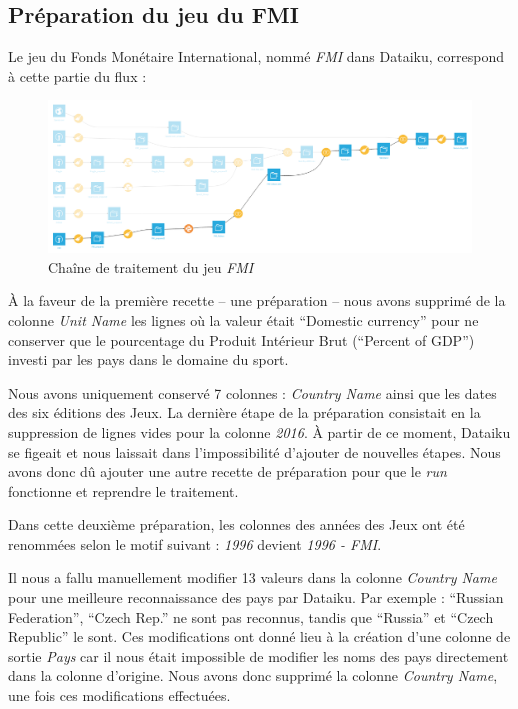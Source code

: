 \documentclass[hidelinks, 12pt]{report}
\begin{document}
\subsection{Préparation du jeu du FMI}

Le jeu du Fonds Monétaire International, nommé \textit{FMI} dans Dataiku, correspond à cette partie du flux :

\begin{center}
	\begin{figure}[H]
		\setlength{\belowcaptionskip}{-35pt}
		\includegraphics[scale=0.35]{images/flow-medals-fmi.png}
		\caption{Chaîne de traitement du jeu \textit{FMI}}
	\end{figure}
\end{center}

À la faveur de la première recette -- une préparation -- nous avons supprimé de la colonne \textit{Unit Name} les lignes où la valeur était \enquote{Domestic currency} pour ne conserver que le pourcentage du Produit Intérieur Brut (\enquote{Percent of GDP}) investi par les pays dans le domaine du sport.

Nous avons uniquement conservé 7 colonnes : \textit{Country Name} ainsi que les dates des six éditions des Jeux. La dernière étape de la préparation consistait en la suppression de lignes vides pour la colonne \textit{2016}. À partir de ce moment, Dataiku se figeait et nous laissait dans l'impossibilité d'ajouter de nouvelles étapes. Nous avons donc dû ajouter une autre recette de préparation pour que le \textit{run} fonctionne et reprendre le traitement.

Dans cette deuxième préparation, les colonnes des années des Jeux ont été renommées selon le motif suivant : \textit{1996} devient \textit{1996 - FMI}.

Il nous a fallu manuellement modifier 13 valeurs dans la colonne \emph{Country Name} pour une meilleure reconnaissance des pays par Dataiku. Par exemple : \enquote{Russian Federation}, \enquote{Czech Rep.} ne sont pas reconnus, tandis que \enquote{Russia} et \enquote{Czech Republic} le sont. Ces modifications ont donné lieu à la création d'une colonne de sortie \emph{Pays} car il nous était impossible de modifier les noms des pays directement dans la colonne d'origine. Nous avons donc supprimé la colonne \emph{Country Name}, une fois ces modifications effectuées. 
\end{document}
